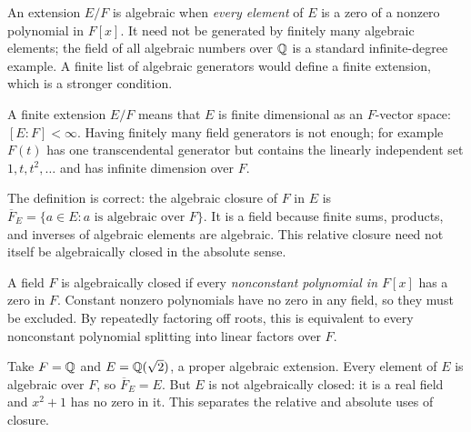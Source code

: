 An extension $E/F$ is algebraic when \emph{every element} of $E$ is a zero of a nonzero polynomial in $F[x]$. It need not be generated by finitely many algebraic elements; the field of all algebraic numbers over $\mathbb{Q}$ is a standard infinite-degree example. A finite list of algebraic generators would define a finite extension, which is a stronger condition.

A finite extension $E/F$ means that $E$ is finite dimensional as an $F$-vector space: $[E:F]<\infty$. Having finitely many field generators is not enough; for example $F(t)$ has one transcendental generator but contains the linearly independent set $1,t,t^2,\ldots$ and has infinite dimension over $F$.

The definition is correct: the algebraic closure of $F$ in $E$ is $\overline F_E=\{a\in E:a\text{ is algebraic over }F\}$. It is a field because finite sums, products, and inverses of algebraic elements are algebraic. This relative closure need not itself be algebraically closed in the absolute sense.

A field $F$ is algebraically closed if every \emph{nonconstant polynomial in $F[x]$} has a zero in $F$. Constant nonzero polynomials have no zero in any field, so they must be excluded. By repeatedly factoring off roots, this is equivalent to every nonconstant polynomial splitting into linear factors over $F$.

Take $F=\mathbb{Q}$ and $E=\mathbb{Q}(\sqrt2)$, a proper algebraic extension. Every element of $E$ is algebraic over $F$, so $\overline F_E=E$. But $E$ is not algebraically closed: it is a real field and $x^2+1$ has no zero in it. This separates the relative and absolute uses of closure.

